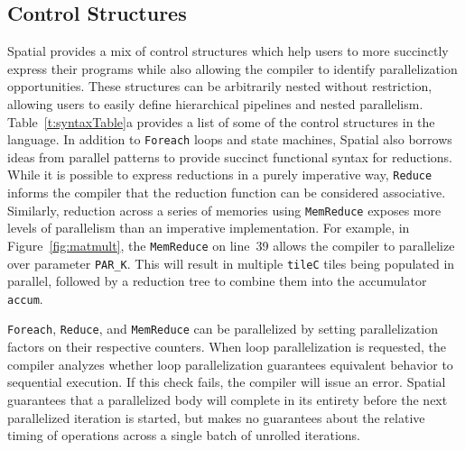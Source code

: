 \subsection{Control Structures}
\label{controls}

Spatial provides a mix of control structures which help users to more succinctly express their programs while also allowing the compiler to identify parallelization opportunities.
These structures can be arbitrarily nested without restriction, allowing users to easily define hierarchical pipelines and nested parallelism. Table~\ref{t:syntaxTable}a provides a list of some of the control structures in the language. In addition to \texttt{\small{Foreach}} loops and state machines, Spatial also borrows ideas
from parallel patterns \cite{delite-tecs14, pldi13halide} to provide succinct functional syntax for reductions.
While it is possible to express
reductions in a purely imperative way, \texttt{\small{Reduce}} informs the compiler that the
reduction function can be considered associative.
Similarly, reduction across a series of memories using \texttt{\small{MemReduce}} exposes more levels of parallelism than an imperative implementation.
For example, in Figure~\ref{fig:matmult}, the \texttt{\small{MemReduce}} on line~39 allows the compiler to parallelize over parameter \texttt{\small{PAR\_K}}. This will result in multiple \texttt{\small{tileC}} tiles being populated in parallel, followed by a reduction tree to combine them into the accumulator \texttt{\small{accum}}.

\texttt{\small{Foreach}}, \texttt{\small{Reduce}}, and \texttt{\small{MemReduce}} can be parallelized by setting parallelization factors on their respective counters.
When loop parallelization is requested, the compiler analyzes whether
loop parallelization guarantees equivalent behavior to sequential execution.
If this check fails, the compiler will issue an error.
Spatial guarantees that a parallelized body will complete in its entirety before the next parallelized iteration is started, but makes no guarantees about the relative timing of operations across a single batch of unrolled iterations.

